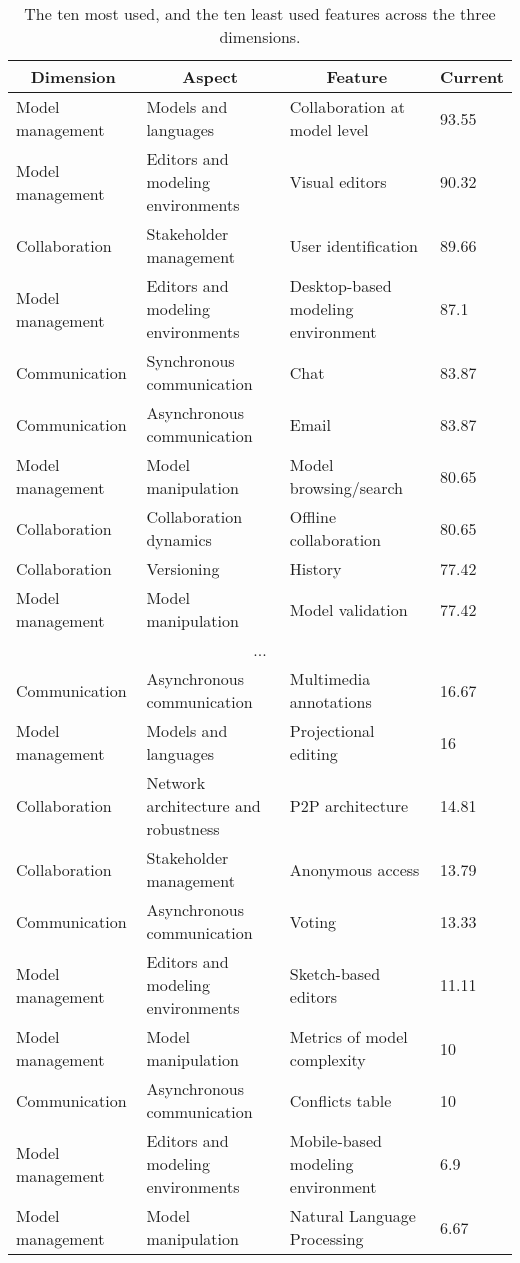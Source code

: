 
  \begin{table*}[]
  \centering
  \notsotiny
  \caption{ The ten most used, and the ten least used features across the three dimensions.}
\label{tab:top-bottom-current}
\begin{tabular}{@{}llll@{}}
  \toprule
\multicolumn{1}{c}{\textbf{Dimension}} & \multicolumn{1}{c}{\textbf{Aspect}} & \multicolumn{1}{c}{\textbf{Feature}} & \multicolumn{1}{c}{\textbf{Current}} \\ 

  \midrule
  Model management & Models and languages & Collaboration at model level & 93.55 \\ 
Model management & Editors and modeling environments & Visual editors & 90.32 \\ 
Collaboration & Stakeholder management & User identification & 89.66 \\ 
Model management & Editors and modeling environments & Desktop-based modeling environment & 87.1 \\ 
Communication & Synchronous communication & Chat & 83.87 \\ 
Communication & Asynchronous communication & Email & 83.87 \\ 
Model management & Model manipulation & Model browsing/search & 80.65 \\ 
Collaboration & Collaboration dynamics & Offline collaboration & 80.65 \\ 
Collaboration & Versioning & History & 77.42 \\ 
Model management & Model manipulation & Model validation & 77.42 \\ 
\multicolumn{4}{c}{...} \\ 
Communication & Asynchronous communication & Multimedia annotations & 16.67 \\ 
Model management & Models and languages & Projectional editing & 16 \\ 
Collaboration & Network architecture and robustness & P2P architecture & 14.81 \\ 
Collaboration & Stakeholder management & Anonymous access & 13.79 \\ 
Communication & Asynchronous communication & Voting & 13.33 \\ 
Model management & Editors and modeling environments & Sketch-based editors & 11.11 \\ 
Model management & Model manipulation & Metrics of model complexity & 10 \\ 
Communication & Asynchronous communication & Conflicts table & 10 \\ 
Model management & Editors and modeling environments & Mobile-based modeling environment & 6.9 \\ 
Model management & Model manipulation & Natural Language Processing & 6.67 \\ 
\bottomrule
  \end{tabular}%
  \end{table*}